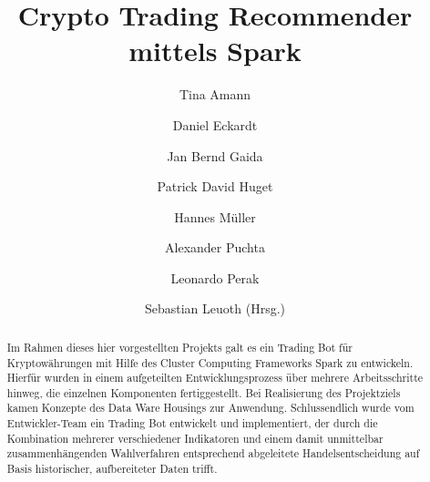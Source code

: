 \documentclass[sigconf]{acmart}
\begin{document}

\title[Crypto Trading Recommender mittels Spark]{Crypto Trading Recommender mittels Spark}

\author{Tina Amann}



\author{Daniel Eckardt}

\author{Jan Bernd Gaida}

\author{Patrick David Huget}

\author{Hannes Müller}

\author{Alexander Puchta}

\author{Leonardo Perak}

\author{Sebastian Leuoth (Hrsg.)}


\begin{abstract}
Im Rahmen dieses hier vorgestellten Projekts galt es ein Trading Bot für Kryptowährungen mit Hilfe des Cluster Computing Frameworks Spark zu entwickeln. Hierfür wurden in einem aufgeteilten Entwicklungsprozess über mehrere Arbeitsschritte hinweg, die einzelnen Komponenten fertiggestellt. Bei Realisierung des Projektziels kamen Konzepte des Data Ware Housings zur Anwendung. Schlussendlich wurde vom Entwickler-Team ein Trading Bot entwickelt und implementiert, der durch die Kombination mehrerer verschiedener Indikatoren und einem damit unmittelbar zusammenhängenden Wahlverfahren entsprechend abgeleitete Handelsentscheidung auf Basis historischer, aufbereiteter Daten trifft. 
\end{abstract}
\end{document}
